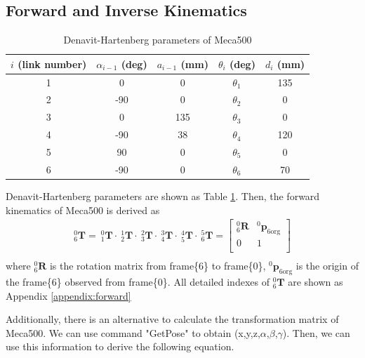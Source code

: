 \subsection{Forward and Inverse Kinematics}
\label{sec:forward}
\begin{table}[htbp]
\centering
\caption{Denavit-Hartenberg parameters of Meca500}
\label{tab:DHtable}
\begin{tabular}{ccccc} 
\hline \hline
$i$ (link number)		&$\alpha _{i-1}$ (deg)	&$a_{i-1}$ (mm)	& $\theta _i$ (deg)			&$d_i$ (mm)	\\
\hline
1   					&0    					&0				&$\theta _1$				&135 \\
2   					&-90   					&0				&$\theta _2$				&0 \\
3  						&0    					&135			&$\theta _3$ 				&0 \\
4   					&-90    				&38				&$\theta _4$ 				&120 \\
5   					&90   					&0				&$\theta _5$ 				&0 \\
6						&-90  					&0				&$\theta _6$ 				&70
\end{tabular}
\end{table}
Denavit-Hartenberg parameters are shown as Table \ref{tab:DHtable}. Then, the forward kinematics of Meca500 is derived as
\begin{equation}
\begin{split}
^0_6\mathbf{T} =
\ ^0_1\mathbf{T} \cdot \ ^1_2\mathbf{T} \cdot \ ^2_3\mathbf{T} \cdot \ ^3_4\mathbf{T} \cdot \ ^4_5\mathbf{T} \cdot \ ^5_6\mathbf{T} =
\begin{bmatrix}
^0_6\mathbf{R}	&^0\boldsymbol{p}_\mathrm{6org}\\
0				&1\\
\end{bmatrix}\\
\end{split}
\end{equation}\label{eq:translation matrix}
where $^0_6\mathbf{R}$ is the rotation matrix from frame\{6\} to frame\{0\}, $^0\boldsymbol{p}_\mathrm{6org}$ is the origin of the frame\{6\} observed from frame\{0\}. All detailed indexes of $^0_6\mathbf{T}$ are shown as Appendix \ref{appendix:forward}
\par
Additionally, there is an alternative to calculate the transformation matrix of Meca500. We can use command "GetPose" to obtain (x,y,z,$\alpha$,$\beta$,$\gamma$). Then, we can use this information to derive the following equation.
